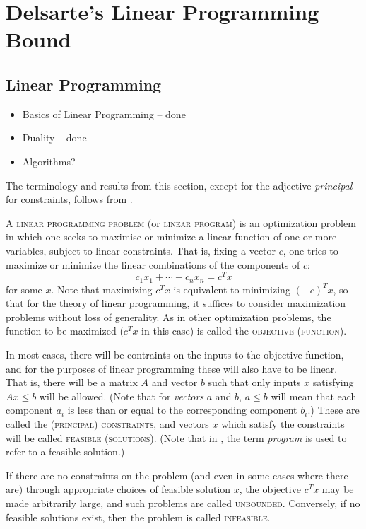 \documentclass{report}
\begin{document}
\chapter{Delsarte's Linear Programming Bound}
  \section{Linear Programming}
    \begin{itemize}
      \item Basics of Linear Programming -- done
      \item Duality -- done
      \item Algorithms?
    \end{itemize}

    The terminology and results from this section,
    except for the adjective \textit{principal} for
    constraints, follows from \cite{matousek}.

    A \textsc{linear programming problem} (or \textsc{linear program})
    is an optimization problem in which one seeks to maximise or minimize
    a linear function of one or more variables, subject to linear constraints.
    That is, fixing a vector $c$, one tries to maximize or minimize
    the linear combinations of the components of $c$:
    $$
      c_1 x_1 + \cdots + c_n x_n = c^T x
    $$
    for some $x$.
    Note that maximizing $c^T x$ is equivalent to minimizing $(-c)^T x$,
    so that for the theory of linear programming,
    it suffices to consider maximization problems without loss of generality.
    As in other optimization problems,
    the function to be maximized ($c^T x$ in this case)
    is called the \textsc{objective (function)}.

    In most cases, there will be contraints on the inputs to the objective
    function, and for the purposes of linear programming these will also have
    to be linear.
    That is, there will be a matrix $A$ and vector $b$
    such that only inputs $x$ satisfying $Ax \leq b$ will be allowed.
    (Note that for \textit{vectors} $a$ and $b$,
    $a \leq b$ will mean that each component $a_i$
    is less than or equal to the corresponding component $b_i$.)
    These are called the \textsc{(principal) constraints},
    and vectors $x$ which satisfy the constraints will be called
    \textsc{feasible (solutions)}.
    (Note that in \cite{delsarte}, the term \textit{program}
    is used to refer to a feasible solution.)

    If there are no constraints on the problem
    (and even in some cases where there are)
    through appropriate choices of feasible solution $x$,
    the objective $c^Tx$ may be made arbitrarily large,
    and such problems are called \textsc{unbounded}.
    Conversely, if no feasible solutions exist,
    then the problem is called \textsc{infeasible}.
\end{document}
